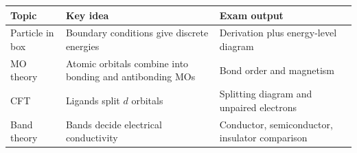 \documentclass[12pt,a4paper]{article}
\begin{document}
\begin{tcolorbox}[tikzbox, title={Summary Reference Table}]
\begin{tabularx}{\linewidth}{|B{3.2cm}|Y|Y|}
\hline
\textbf{Topic} & \textbf{Key idea} & \textbf{Exam output} \\
\hline
Particle in box & Boundary conditions give discrete energies & Derivation plus energy-level diagram \\
\hline
MO theory & Atomic orbitals combine into bonding and antibonding MOs & Bond order and magnetism \\
\hline
CFT & Ligands split $d$ orbitals & Splitting diagram and unpaired electrons \\
\hline
Band theory & Bands decide electrical conductivity & Conductor, semiconductor, insulator comparison \\
\hline
\end{tabularx}
\end{tcolorbox}
\end{document}

